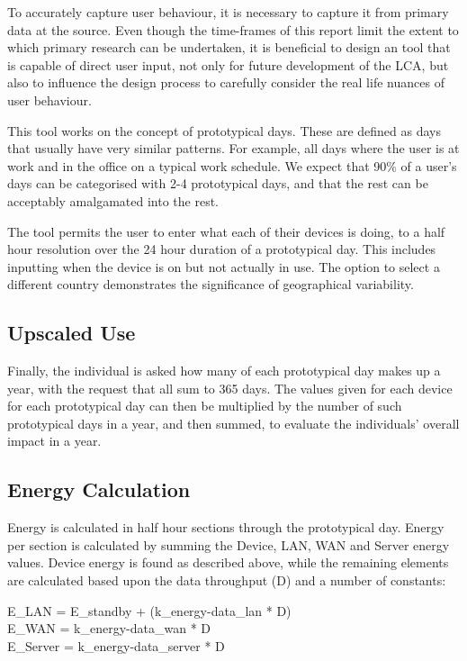\documentclass[conference]{IEEEtran}
\begin{document}
To accurately capture user behaviour, it is necessary to capture it
from primary data at the source. Even though the time-frames of this
report limit the extent to which primary research can be undertaken,
it is beneficial to design an tool that is capable of direct user
input, not only for future development of the LCA, but also to
influence the design process to carefully consider the real life
nuances of user behaviour.

This tool works on the concept of prototypical days. These are defined
as days that usually have very similar patterns. For example, all days
where the user is at work and in the office on a typical work
schedule. We expect that 90\% of a user’s days can be categorised with
2-4 prototypical days, and that the rest can be acceptably amalgamated
into the rest.

The tool permits the user to enter what each of their devices is doing, to a half hour resolution over the 24 hour duration of a prototypical day. This includes inputting when the device is on but not actually in use.
The option to select a different country demonstrates the significance
of geographical variability.

\subsection{Upscaled Use}

Finally, the individual is asked how many of each prototypical day
makes up a year, with the request that all sum to 365 days. The values
given for each device for each prototypical day can then be multiplied
by the number of such prototypical days in a year, and then summed, to
evaluate the individuals' overall impact in a year.

\subsection{Energy Calculation}

Energy is calculated in half hour sections through the prototypical
day. Energy per section is calculated by summing the Device, LAN, WAN
and Server energy values. Device energy is found as described above,
while the remaining elements are calculated based upon the data
throughput (D) and a number of constants:

E\_LAN = E\_standby + (k\_energy-data\_lan * D)\\
E\_WAN = k\_energy-data\_wan * D\\
E\_Server = k\_energy-data\_server * D\\
\end{document}
